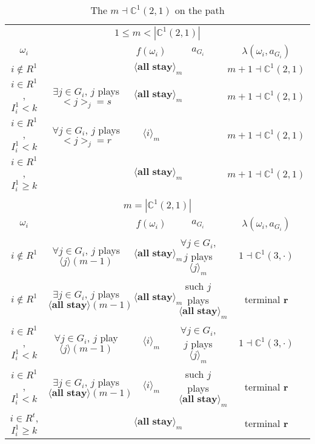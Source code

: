\documentclass[12pt,letter]{article}
\newcommand{\Kappa}{\mathbb{C}}
\theoremstyle{definition}
\theoremstyle{definition}
\theoremstyle{remark}
\theoremstyle{claim}
\begin{document}
\begin{landscape}
\begin{table}[!htbp]
\caption{The $m\dashv\Kappa^1(2,1)$ on the path}
\label{table:eqm_path_k02}
\begin{center}
\begin{tabular}{c c | c | c | c}
\multicolumn{5}{c}{$1\leq m < |\Kappa^1(2,1)|$}\\
$\omega_i$ 	 & 	   &	$f(\omega_i)$  &	$a_{G_i}$ & $\lambda(\omega_i,a_{G_i})$ \\
\hline
\hline
$i\notin R^1$  	& & $\langle \textbf{all stay} \rangle_m$	&    & $m+1\dashv \Kappa^1(2,1)$\\
$i\in R^1$, $I^1_i< k$  	& $\exists j\in G_i$, $j$ plays $<j>_j=s$	& $\langle \textbf{all stay} \rangle_m$	& 	& $m+1\dashv \Kappa^1(2,1)$\\
$i\in R^1$, $I^1_i< k$  	& $\forall j\in G_i$, $j$ plays $<j>_j=r$ 	& $\langle i \rangle_m$	& 	& $m+1\dashv \Kappa^1(2,1)$\\
$i\in R^1$, $I^1_i\geq k$  	& 	& $\langle \textbf{all stay} \rangle_m$	&	& $m+1\dashv \Kappa^1(2,1)$\\
\hline
\\
\multicolumn{5}{c}{$m= |\Kappa^1(2,1)|$}\\
$\omega_i$ 	 & 	   &	$f(\omega_i)$  &	$a_{G_i}$ & $\lambda(\omega_i,a_{G_i})$ \\
\hline
\hline
$i\notin R^1$  	& $\forall j\in G_i$, $j$ plays $\langle j \rangle(m-1)$    & $\langle \textbf{all stay} \rangle_m$	& $\forall j\in G_i$, $j$ plays $\langle j \rangle_m$	& $1\dashv \Kappa^1(3,\cdot)$\\
$i\notin R^1$  	& $\exists j\in G_i$, $j$ plays $\langle \textbf{all stay} \rangle(m-1)$   & $\langle \textbf{all stay} \rangle_m$	& such $j$ plays $\langle \textbf{all stay} \rangle_m$	& terminal \textbf{r}\\
$i\in R^1$, $I^1_i< k$   	& $\forall j\in G_i$, $j$ play $\langle j \rangle(m-1)$ 	& $\langle i \rangle_m$	&  $\forall j\in G_i$, $j$ plays $\langle j \rangle_m$	& $1\dashv \Kappa^1(3,\cdot)$ \\
$i\in R^1$, $I^1_i< k$   	&  $\exists j\in G_i$, $j$ plays $\langle \textbf{all stay} \rangle(m-1)$ 	& $\langle i \rangle_m$	& such $j$ plays $\langle \textbf{all stay} \rangle_m$	&  terminal \textbf{r}\\
$i\in R^t$, $I^1_i\geq k$  	& 	& $\langle \textbf{all stay} \rangle_m$	& 	& terminal \textbf{r} \\
\hline
\end{tabular}
\end{center}
\end{table}

\end{landscape}
\end{document}
